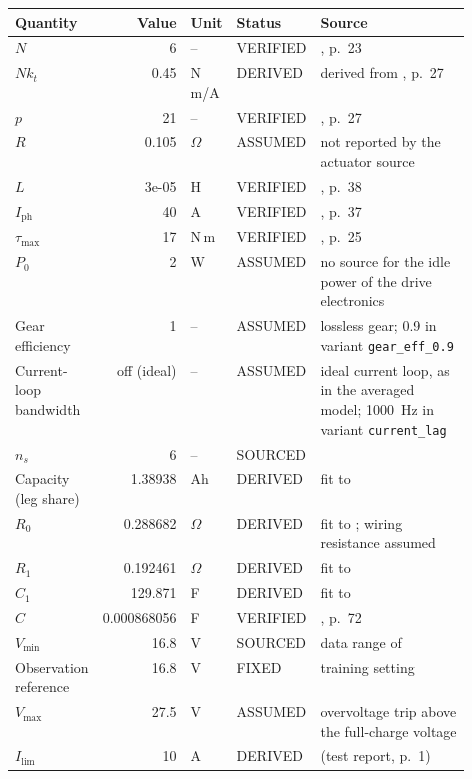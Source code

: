{\footnotesize\setlength{\tabcolsep}{3pt}\begin{tabular}{>{\raggedright\arraybackslash}p{0.14\linewidth}rll>{\raggedright\arraybackslash}p{0.39\linewidth}}\toprule
Quantity & Value & Unit & Status & Source \\\midrule
$N$ & 6 & -- & VERIFIED & \cite{katz2018actuator}, p.~23 \\
$Nk_t$ & 0.45 & N\,m/A & DERIVED & derived from \cite{katz2018actuator}, p.~27 \\
$p$ & 21 & -- & VERIFIED & \cite{katz2018actuator}, p.~27 \\
$R$ & 0.105 & $\Omega$ & ASSUMED & not reported by the actuator source \\
$L$ & 3e-05 & H & VERIFIED & \cite{katz2018actuator}, p.~38 \\
$I_{\mathrm{ph}}$ & 40 & A & VERIFIED & \cite{katz2018actuator}, p.~37 \\
$\tau_{\max}$ & 17 & N\,m & VERIFIED & \cite{katz2018actuator}, p.~25 \\
$P_0$ & 2 & W & ASSUMED & no source for the idle power of the drive electronics \\
Gear efficiency & 1 & -- & ASSUMED & lossless gear; 0.9 in variant \texttt{gear\_eff\_0.9} \\
Current-loop bandwidth & off (ideal) & -- & ASSUMED & ideal current loop, as in the averaged model; 1000~Hz in variant \texttt{current\_lag} \\
$n_s$ & 6 & -- & SOURCED & \cite{unitree2026go1battery} \\
Capacity (leg share) & 1.38938 & Ah & DERIVED & fit to \cite{kollmeyer2020hg2} \\
$R_0$ & 0.288682 & $\Omega$ & DERIVED & fit to \cite{kollmeyer2020hg2}; wiring resistance assumed \\
$R_1$ & 0.192461 & $\Omega$ & DERIVED & fit to \cite{kollmeyer2020hg2} \\
$C_1$ & 129.871 & F & DERIVED & fit to \cite{kollmeyer2020hg2} \\
$C$ & 0.000868056 & F & VERIFIED & \cite{katz2018actuator}, p.~72 \\
$V_{\min}$ & 16.8 & V & SOURCED & data range of \cite{kollmeyer2020hg2} \\
Observation reference & 16.8 & V & FIXED & training setting \\
$V_{\max}$ & 27.5 & V & ASSUMED & overvoltage trip above the full-charge voltage \\
$I_{\lim}$ & 10 & A & DERIVED & \cite{kollmeyer2020hg2} (test report, p.~1) \\

\end{tabular}}
